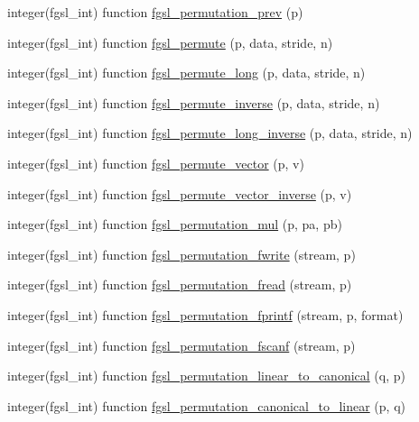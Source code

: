 \begin{DoxyCompactItemize}
\item 
integer(fgsl\+\_\+int) function \hyperlink{permutation_8finc_ad79479a9b29165694fac758d0273dd3b}{fgsl\+\_\+permutation\+\_\+prev} (p)
\item 
integer(fgsl\+\_\+int) function \hyperlink{permutation_8finc_a64ded2ffe57374e81cc24d8ad04b6148}{fgsl\+\_\+permute} (p, data, stride, n)
\item 
integer(fgsl\+\_\+int) function \hyperlink{permutation_8finc_ae71ea0ea188f81ca85fe057156e3d640}{fgsl\+\_\+permute\+\_\+long} (p, data, stride, n)
\item 
integer(fgsl\+\_\+int) function \hyperlink{permutation_8finc_acd5ee6d013add3c9e7d1eb17894f5052}{fgsl\+\_\+permute\+\_\+inverse} (p, data, stride, n)
\item 
integer(fgsl\+\_\+int) function \hyperlink{permutation_8finc_ad2e7ff6db70fadebed473132caea4d0a}{fgsl\+\_\+permute\+\_\+long\+\_\+inverse} (p, data, stride, n)
\item 
integer(fgsl\+\_\+int) function \hyperlink{permutation_8finc_ab81bbdcef327e226cd027f97e0a05a95}{fgsl\+\_\+permute\+\_\+vector} (p, v)
\item 
integer(fgsl\+\_\+int) function \hyperlink{permutation_8finc_a2549c3a5bd772265ce9000cfaa6450dc}{fgsl\+\_\+permute\+\_\+vector\+\_\+inverse} (p, v)
\item 
integer(fgsl\+\_\+int) function \hyperlink{permutation_8finc_ab7b90e7b838d166f4522534e3fdb4892}{fgsl\+\_\+permutation\+\_\+mul} (p, pa, pb)
\item 
integer(fgsl\+\_\+int) function \hyperlink{permutation_8finc_ad5f09fa0443ced857bf3707d63e722ca}{fgsl\+\_\+permutation\+\_\+fwrite} (stream, p)
\item 
integer(fgsl\+\_\+int) function \hyperlink{permutation_8finc_a12d2a8bdd550b927c26430cfe7a1f8a3}{fgsl\+\_\+permutation\+\_\+fread} (stream, p)
\item 
integer(fgsl\+\_\+int) function \hyperlink{permutation_8finc_adcb7bf1d2df5b5a5c929c8c2d2c226f6}{fgsl\+\_\+permutation\+\_\+fprintf} (stream, p, format)
\item 
integer(fgsl\+\_\+int) function \hyperlink{permutation_8finc_aa083e7f38a4e3a1d52c65cff84c58427}{fgsl\+\_\+permutation\+\_\+fscanf} (stream, p)
\item 
integer(fgsl\+\_\+int) function \hyperlink{permutation_8finc_ad78bb0a655c528b6119c36e27e4ba80e}{fgsl\+\_\+permutation\+\_\+linear\+\_\+to\+\_\+canonical} (q, p)
\item 
integer(fgsl\+\_\+int) function \hyperlink{permutation_8finc_adf466e8130262699f0fc3c537628cd69}{fgsl\+\_\+permutation\+\_\+canonical\+\_\+to\+\_\+linear} (p, q)

\end{DoxyCompactItemize}

